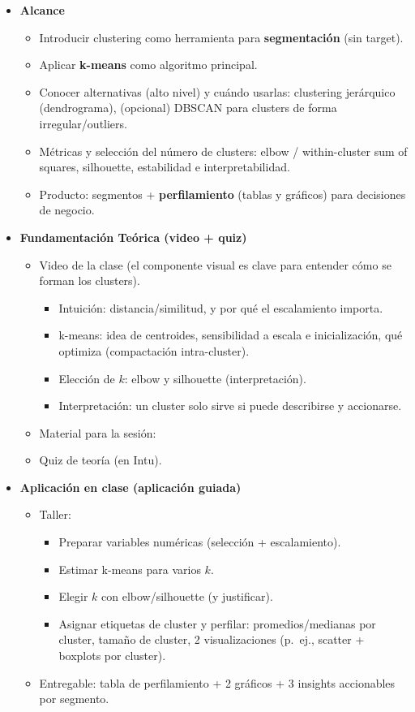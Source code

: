\documentclass{article}
\begin{document}
\begin{itemize}
\item \textbf{Alcance}
\begin{itemize}
  \item Introducir clustering como herramienta para \textbf{segmentación} (sin target).
  \item Aplicar \textbf{k-means} como algoritmo principal.
  \item Conocer alternativas (alto nivel) y cuándo usarlas: clustering jerárquico (dendrograma), (opcional) DBSCAN para clusters de forma irregular/outliers.
  \item Métricas y selección del número de clusters: elbow / within-cluster sum of squares, silhouette, estabilidad e interpretabilidad.
  \item Producto: segmentos + \textbf{perfilamiento} (tablas y gráficos) para decisiones de negocio.
\end{itemize}

\item \textbf{Fundamentación Teórica (video + quiz)}
\begin{itemize}
  \item Video de la clase (el componente visual es clave para entender cómo se forman los clusters). %
  \begin{itemize}
    \item Intuición: distancia/similitud, y por qué el escalamiento importa.
    \item k-means: idea de centroides, sensibilidad a escala e inicialización, qué optimiza (compactación intra-cluster).
    \item Elección de $k$: elbow y silhouette (interpretación).
    \item Interpretación: un cluster solo sirve si puede describirse y accionarse.
  \end{itemize}
  \item Material para la sesión: %
  \item Quiz de teoría (en Intu).
\end{itemize}

\item \textbf{Aplicación en clase (aplicación guiada)}
\begin{itemize}
  \item Taller:
  \begin{itemize}
    \item Preparar variables numéricas (selección + escalamiento).
    \item Estimar k-means para varios $k$.
    \item Elegir $k$ con elbow/silhouette (y justificar).
    \item Asignar etiquetas de cluster y perfilar: promedios/medianas por cluster, tamaño de cluster, 2 visualizaciones (p.\ ej., scatter + boxplots por cluster).
  \end{itemize}
  \item Entregable: tabla de perfilamiento + 2 gráficos + 3 insights accionables por segmento.
\end{itemize}
\end{itemize}
\end{document}

